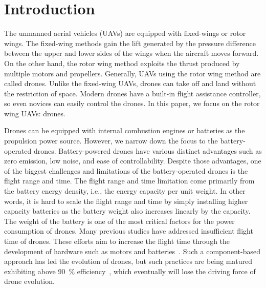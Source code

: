 \documentclass[journal]{./template/IEEEtran}
\begin{document}
\section{Introduction}
\label{Section: introduction}

The unmanned aerial vehicles (UAVs) are equipped with fixed-wings or rotor wings.
The fixed-wing methods gain the lift generated by the pressure difference between the upper and lower sides of the wings when the aircraft moves forward. 
On the other hand, the rotor wing method exploits the thrust produced by multiple motors and propellers. Generally, UAVs using the rotor wing method are called drones. Unlike the fixed-wing UAVs, drones can take off and land without the restriction of space. 
Modern drones have a built-in flight assistance controller, so even novices can easily control the drones. 
In this paper, we focus on the rotor wing UAVs: drones. %

Drones can be equipped with internal combustion engines or batteries as the propulsion power source. However, we narrow down the focus to the battery-operated drones.
Battery-powered drones have various distinct advantages such as zero emission, low noise, and ease of controllability.
Despite those advantages, one of the biggest challenges and limitations of the battery-operated drones is the flight range and time. 
The flight range and time limitation come primarily from the battery energy density, i.e., the energy capacity per unit weight.
In other words, it is hard to scale the flight range and time by simply installing higher capacity batteries as the battery weight also increases linearly by the capacity. 
The weight of the battery is one of the most critical factors for the power consumption of drones. 
Many previous studies have addressed insufficient flight time of drones. 
These efforts aim to increase the flight time through the development of hardware such as motors and batteries~\cite{ref_1}.
Such a component-based approach has led the evolution of drones, but such practices are being matured exhibiting above 90~\% efficiency~\cite{ref_2}, which eventually will lose the driving force of drone evolution. 
\end{document}
